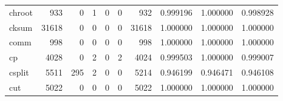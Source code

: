 \begin{tabular}{lrrrrrrrrr}
chroot    &                                 933 &                                               0 &                                              1 &                                             0 &                                              0 &                                          932 &                                           0.999196 &                               1.000000 &                             0.998928 \\
cksum     &                               31618 &                                               0 &                                              0 &                                             0 &                                              0 &                                        31618 &                                           1.000000 &                               1.000000 &                             1.000000 \\
comm      &                                 998 &                                               0 &                                              0 &                                             0 &                                              0 &                                          998 &                                           1.000000 &                               1.000000 &                             1.000000 \\
cp        &                                4028 &                                               0 &                                              2 &                                             0 &                                              2 &                                         4024 &                                           0.999503 &                               1.000000 &                             0.999007 \\
csplit    &                                5511 &                                             295 &                                              2 &                                             0 &                                              0 &                                         5214 &                                           0.946199 &                               0.946471 &                             0.946108 \\
cut       &                                5022 &                                               0 &                                              0 &                                             0 &                                              0 &                                         5022 &                                           1.000000 &                               1.000000 &                             1.000000 \\

\end{tabular}
